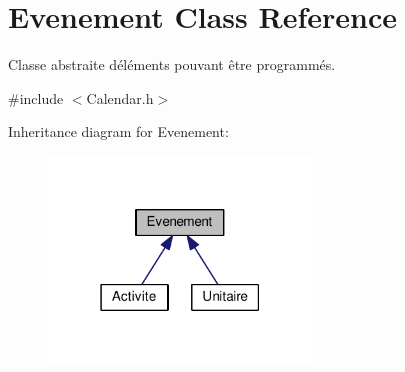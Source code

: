 \hypertarget{class_evenement}{}\section{Evenement Class Reference}
\label{class_evenement}


Classe abstraite d\textquotesingle{}éléments pouvant être programmés.  




{\ttfamily \#include $<$Calendar.\+h$>$}



Inheritance diagram for Evenement\+:\nopagebreak
\begin{figure}[H]
\begin{center}
\leavevmode
\includegraphics[width=198pt]{class_evenement__inherit__graph}
\end{center}
\end{figure}
